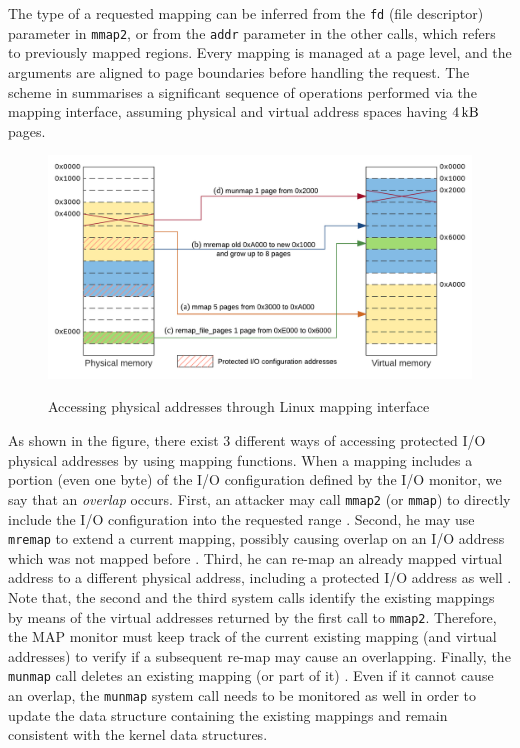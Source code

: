 The type of a requested mapping can be inferred from the \verb|fd| (file descriptor) parameter in \verb|mmap2|,
or from the \verb|addr| parameter in the other calls, which refers to previously mapped regions.
Every mapping is managed at a page level, and the arguments are aligned to page boundaries before handling the request.
The scheme in  summarises a significant sequence of operations performed via the mapping interface,
assuming physical and virtual address spaces having $\SI{4}{\kilo\byte}$ pages.
\begin{figure}[h]
\centerline{
\includegraphics[width=\textwidth]{res/map_linux}}
\caption{Accessing physical addresses through Linux mapping interface \label{fig:map-linux}}
{\ignorespaces\label{fig:mmap}}
{\ignorespaces\label{fig:mremap}}
{\ignorespaces\label{fig:remapfp}}
{\ignorespaces\label{fig:munmap}}
\end{figure}
As shown in the figure, there exist $3$ different ways of accessing protected I/O physical addresses by using mapping functions.
When a mapping includes a portion (even one byte) of the I/O configuration defined by the I/O monitor, we say that an \emph{overlap} occurs.
First, an attacker may call \verb|mmap2| (or \verb|mmap|) to directly include the I/O configuration into the requested range .
Second, he may use \verb|mremap| to extend a current mapping, possibly causing overlap on an I/O address which was not mapped before .
Third, he can re-map an already mapped virtual address to a different physical address, including a protected I/O address as well .
Note that, the second and the third system calls identify the existing mappings by means of the virtual addresses returned by the first call to \verb|mmap2|.
Therefore, the MAP monitor must keep track of the current existing mapping (and virtual addresses) to verify if a subsequent re-map may cause an overlapping.
Finally, the \verb|munmap| call deletes an existing mapping (or part of it) . Even if it cannot cause an overlap,
the \verb|munmap| system call needs to be monitored as well in order to update the data structure containing the existing mappings and remain
consistent with the kernel data structures.

